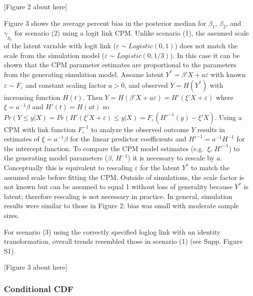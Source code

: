 \documentclass[
]{article}
\begin{document}
{[}Figure 2 about here{]}

Figure 3 shows the average percent bias in the posterior median for \(\beta_1\), \(\beta_2\), and \(\gamma_{y_k}\) for scenario (2) using a logit link CPM. Unlike scenario (1), the assumed scale of the latent variable with logit link (\(\varepsilon \sim Logistic(0,1)\)) does not match the scale from the simulation model (\(\varepsilon \sim Logistic(0,1/3)\)). In this case it can be shown that the CPM parameter estimates are proportional to the parameters from the generating simulation model. Assume latent \(Y^*=\beta'X + a\varepsilon\) with known \(\varepsilon \sim F_{\varepsilon}\) and constant scaling factor \(a>0\), and observed \(Y=H(Y^*)\) with increasing function \(H(t)\). Then \(Y=H(\beta'X+a\varepsilon)=H'(\xi'X+\varepsilon)\) where \(\xi=a^{-1}\beta\) and \(H'(t)=H(at)\) so \(Pr(Y \le y|X)=Pr(H'(\xi'X+\varepsilon)\le y|X)=F_{\varepsilon}(H'^{-1}(y)-\xi'X)\). Using a CPM with link function \(F_{\varepsilon}^{-1}\) to analyze the observed outcome \(Y\) results in estimates of \(\xi=a^{-1}\beta\) for the linear predictor coefficients and \(H'^{-1}=a^{-1}H^{-1}\) for the intercept function. To compare the CPM model estimates (e.g.~\(\xi\), \(H'^{-1}\)) to the generating model parameters (\(\beta\), \(H^{-1}\)) it is necessary to rescale by \(a\). Conceptually this is equivalent to rescaling \(\varepsilon\) for the
latent \(Y^*\) to match the assumed scale before fitting the CPM. Outside of simulations, the scale factor is not known but can be assumed to equal 1 without loss of generality because \(Y^*\) is latent; therefore rescaling is not necessary in practice. In general, simulation results were similar to those in Figure 2; bias was small with moderate sample sizes.

For scenario (3) using the correctly specified loglog link with an identity transformation, overall trends resembled those in scenario (1) (see Supp. Figure S1).

{[}Figure 3 about here{]}

\hypertarget{conditional-cdf}{%
\subsubsection{Conditional CDF}\label{conditional-cdf}}
\end{document}
